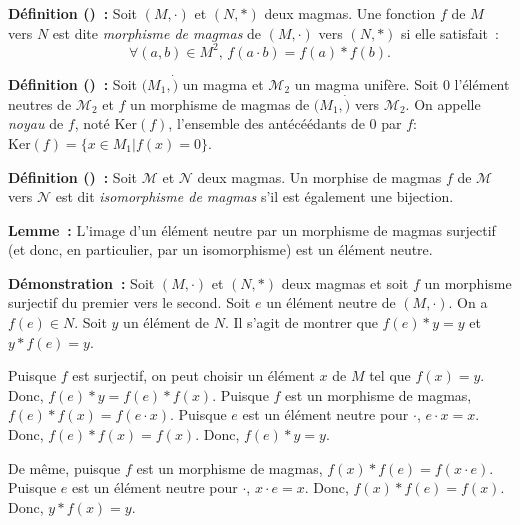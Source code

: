     \done

\medskip

\noindent\textbf{Définition () :} Soit $\left(M, \cdot \right)$ et $\left(N, \ast \right)$ deux magmas.
    Une fonction $f$ de $M$ vers $N$ est dite \textit{morphisme de magmas} de $\left(M, \cdot \right)$ vers $\left(N, \ast \right)$ si elle satisfait : 
    \begin{equation*}
        \forall (a,b) \in M^2, \, f (a \cdot b) = f(a) \ast f(b) .
    \end{equation*}

\medskip

\noindent\textbf{Définition () :} Soit $(M_1, \dot)$ un magma et $\mathcal{M}_2$ un magma unifère.  
    Soit $0$ l'élément neutres de $\mathcal{M}_2$ et $f$ un morphisme de magmas de $(M_1, \dot)$ vers $\mathcal{M}_2$.
    On appelle \emph{noyau} de $f$, noté $\mathrm{Ker}(f)$, l'ensemble des antécéédants de $0$ par $f$: $\mathrm{Ker}(f) = \lbrace x \in M_1 \vert f(x) = 0 \rbrace$.

\medskip

\noindent\textbf{Définition () :} Soit $\mathcal{M}$ et $\mathcal{N}$ deux magmas.
    Un morphise de magmas $f$ de $\mathcal{M}$ vers $\mathcal{N}$ est dit \textit{isomorphisme de magmas} s'il est également une bijection.

\medskip

\noindent\textbf{Lemme :} L'image d'un élément neutre par un morphisme de magmas surjectif (et donc, en particulier, par un isomorphisme) est un élément neutre.

\medskip

\noindent\textbf{Démonstration :} Soit $\left(M, \cdot \right)$ et $\left(N, \ast \right)$ deux magmas et soit $f$ un morphisme surjectif du premier vers le second. 
    Soit $e$ un élément neutre de $\left(M, \cdot \right)$. 
    On a $f(e) \in N$. 
    Soit $y$ un élément de $N$. 
    Il s'agit de montrer que $f(e) \ast y = y$ et $y \ast f(e) = y$.

    Puisque $f$ est surjectif, on peut choisir un élément $x$ de $M$ tel que $f(x) = y$. 
    Donc, $f(e) \ast y = f(e) \ast f(x)$. 
    Puisque $f$ est un morphisme de magmas, $f(e) \ast f(x) = f(e \cdot x)$. 
    Puisque $e$ est un élément neutre pour $\cdot$, $e \cdot x = x$. 
    Donc, $f(e) \ast f(x) = f(x)$.
    Donc, $f(e) \ast y = y$. 

    De même, puisque $f$ est un morphisme de magmas, $f(x) \ast f(e) = f(x \cdot e)$. 
    Puisque $e$ est un élément neutre pour $\cdot$, $x \cdot e = x$. 
    Donc, $f(x) \ast f(e) = f(x)$.
    Donc, $y \ast f(x) = y$. 

